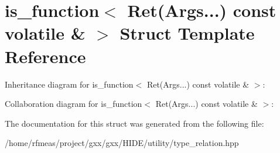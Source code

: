 \hypertarget{structis__function_3_01Ret_07Args_8_8_8_08_01const_01volatile_01_6_01_4}{}\section{is\+\_\+function$<$ Ret(Args...) const volatile \& $>$ Struct Template Reference}
\label{structis__function_3_01Ret_07Args_8_8_8_08_01const_01volatile_01_6_01_4}


Inheritance diagram for is\+\_\+function$<$ Ret(Args...) const volatile \& $>$\+:


Collaboration diagram for is\+\_\+function$<$ Ret(Args...) const volatile \& $>$\+:


The documentation for this struct was generated from the following file\+:\begin{DoxyCompactItemize}
\item 
/home/rfmeas/project/gxx/gxx/\+H\+I\+D\+E/utility/type\+\_\+relation.\+hpp\end{DoxyCompactItemize}
